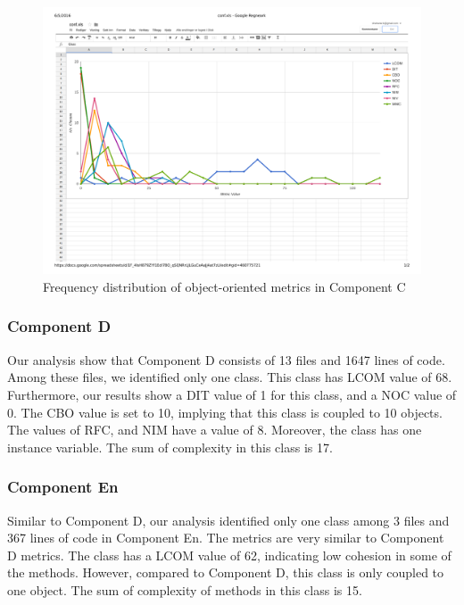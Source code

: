 \begin{landscape}
\setlength\LTleft{-.5in}
	\begin{figure}
	\centering
	\includegraphics[width=\textwidth]{images/pdf/conf.pdf}
	\caption{Frequency distribution of object-oriented metrics in Component C}
	\label{fig:confgraph}
	\end{figure}
\end{landscape}


\subsubsection{Component D}
Our analysis show that Component D consists of 13 files and 1647 lines of code. Among these files, we identified only one class. This class has LCOM value of 68. Furthermore, our results show a DIT value of 1 for this class, and a NOC value of 0. The CBO value is set to 10, implying that this class is coupled to 10 objects. The values of RFC, and NIM have a value of 8. Moreover, the class has one instance variable. The sum of complexity in this class is 17.

\subsubsection{Component En}
Similar to Component D, our analysis identified only one class among 3 files and 367 lines of code in Component En. The metrics are very similar to Component D metrics. The class has a LCOM value of 62, indicating low cohesion in some of the methods. However, compared to Component D, this class is only coupled to one object. The sum of complexity of methods in this class is 15.


